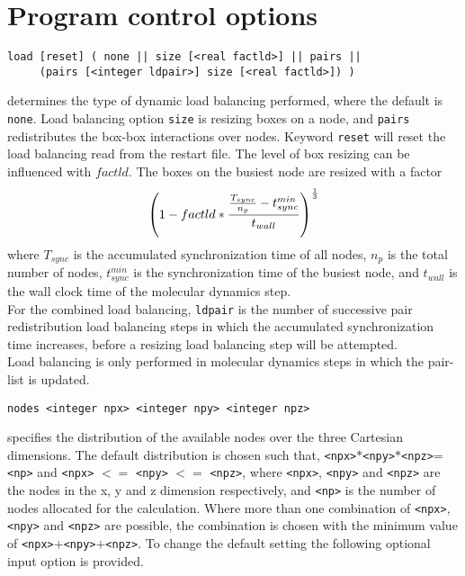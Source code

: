 \section{Program control options}
\begin{description}
\item
\begin{verbatim}
load [reset] ( none || size [<real factld>] || pairs ||
     (pairs [<integer ldpair>] size [<real factld>]) )
\end{verbatim}
determines the type of dynamic load balancing performed,
where the default is {\tt none}. Load balancing option {\tt size}
is resizing boxes on a node, and {\tt pairs} redistributes the
box-box interactions over nodes. Keyword \verb+reset+ will reset the
load balancing read from the restart file. The level of box resizing
can be influenced with $factld$. The boxes on the busiest node are
resized with a factor
\begin{equation}
\left( 1 - factld * { {T_{sync} \over n_p} - t^{min}_{sync} \over t_{wall}}
\right)^{1\over 3}
\end{equation}
where $T_{sync}$ is the accumulated synchronization time of all nodes,
$n_p$ is the total number of nodes, $t^{min}_{sync}$ is the synchronization
time of the busiest node, and $t_{wall}$ is the wall clock time of the
molecular dynamics step.\\
For the combined load balancing, \verb+ldpair+ is the number of successive pair 
redistribution load balancing steps in which the accumulated synchronization
time increases, before a resizing load balancing step will be attempted.\\
Load balancing is only performed in molecular dynamics steps in which the
pair-list is updated.

\item
\begin{verbatim}
nodes <integer npx> <integer npy> <integer npz>
\end{verbatim}
specifies the distribution of the available nodes over the three 
Cartesian dimensions. The default distribution is chosen such that, 
\verb+<npx>+$*$\verb+<npy>+$*$\verb+<npz>+=\verb+<np>+
and \verb+<npx>+ $<=$ \verb+<npy>+ $<=$ \verb+<npz>+, 
where \verb+<npx>+, \verb+<npy>+ and \verb+<npz>+ are the nodes in the
x, y and z dimension respectively, and \verb+<np>+ is the number of nodes
allocated for the calculation. Where more than one combination
of \verb+<npx>+, \verb+<npy>+ and \verb+<npz>+ are possible, the 
combination is chosen with the minimum value of 
\verb+<npx>+$+$\verb+<npy>+$+$\verb+<npz>+. To change the default setting
the following optional input option is provided.


\end{description}
